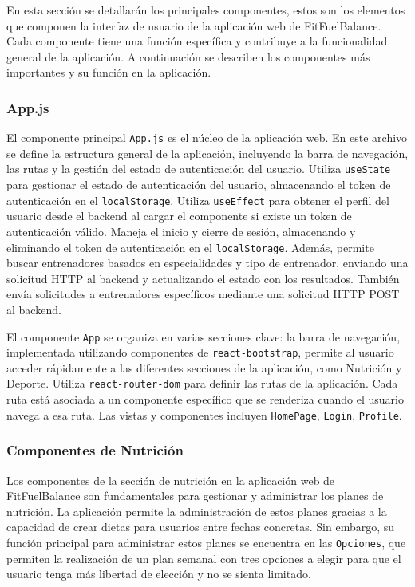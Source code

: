 En esta sección se detallarán los principales componentes, estos son los elementos que componen la interfaz de usuario de la aplicación web de FitFuelBalance. Cada componente tiene una función específica y contribuye a la funcionalidad general de la aplicación. A continuación se describen los componentes más importantes y su función en la aplicación.
\subsubsection{App.js}
El componente principal \texttt{App.js}  es el núcleo de la aplicación web. En este archivo se define la estructura general de la aplicación, incluyendo la barra de navegación, las rutas y la gestión del estado de autenticación del usuario. Utiliza \texttt{useState} para gestionar el estado de autenticación del usuario, almacenando el token de autenticación en el \texttt{localStorage}. Utiliza \texttt{useEffect} para obtener el perfil del usuario desde el backend al cargar el componente si existe un token de autenticación válido. Maneja el inicio y cierre de sesión, almacenando y eliminando el token de autenticación en el \texttt{localStorage}. Además, permite buscar entrenadores basados en especialidades y tipo de entrenador, enviando una solicitud HTTP al backend y actualizando el estado con los resultados. También envía solicitudes a entrenadores específicos mediante una solicitud HTTP POST al backend.

El componente \texttt{App} se organiza en varias secciones clave: la barra de navegación, implementada utilizando componentes de \texttt{react-bootstrap}, permite al usuario acceder rápidamente a las diferentes secciones de la aplicación, como Nutrición y Deporte. Utiliza \texttt{react-router-dom} para definir las rutas de la aplicación. Cada ruta está asociada a un componente específico que se renderiza cuando el usuario navega a esa ruta. Las vistas y componentes incluyen \texttt{HomePage}, \texttt{Login}, \texttt{Profile}.

\subsubsection{Componentes de Nutrición}
Los componentes de la sección de nutrición  en la aplicación web de FitFuelBalance son fundamentales para gestionar y administrar los planes de nutrición. La aplicación permite la administración de estos planes gracias a la capacidad de crear dietas para usuarios entre fechas concretas. Sin embargo, su función principal para administrar estos planes se encuentra en las \texttt{Opciones}, que permiten la realización de un plan semanal con tres opciones a elegir para que el usuario tenga más libertad de elección y no se sienta limitado.


